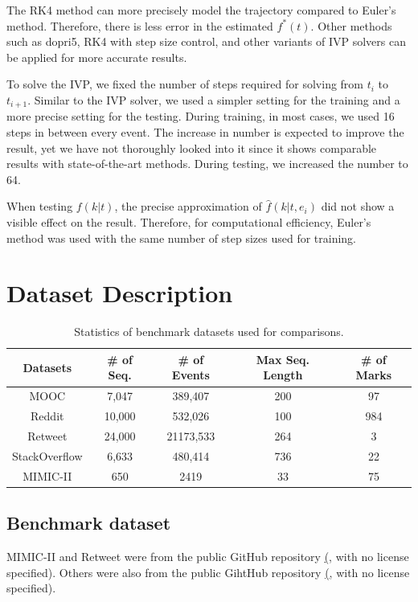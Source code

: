 The RK4 method can more precisely model the trajectory compared to Euler's method. 
Therefore, there is less error in the estimated $f^*(t)$.
Other methods such as dopri5, RK4 with step size control, and other variants of IVP solvers can be applied for more accurate results.

To solve the IVP, we fixed the number of steps required for solving from $t_i$ to $t_{i+1}$. Similar to the IVP solver, we used a simpler setting for the training and a more precise setting for the testing. During training, in most cases, we used 16 steps in between every event. The increase in number is expected to improve the result, yet we have not thoroughly looked into it since it shows comparable results with state-of-the-art methods. During testing, we increased the number to 64.

When testing $f(k|t)$, the precise approximation of $\hat{f} (k|t, e_i)$ did not show a visible effect on the result.
Therefore, for computational efficiency, Euler's method was used with the same number of step sizes used for training.



\section{Dataset Description}
\begin{table}[h]
    \centering
    \renewcommand{\arraystretch}{1.3}
        \begin{tabular}{c|c c c c}
            Datasets & \# of Seq. & \# of Events & Max Seq. Length & \# of Marks \\
            \hline
             MOOC & 7,047 & 389,407 & 200 & 97 \\ 
             Reddit & 10,000 & 532,026 & 100 & 984 \\ 
             Retweet & 24,000 & 21173,533 & 264 & 3 \\ 
             StackOverflow & 6,633 & 480,414 & 736 & 22 \\ 
             MIMIC-II & 650 & 2419 & 33 & 75 \\ 
        \end{tabular}
        \caption{Statistics of benchmark datasets used for comparisons.}
        \label{tab:data_stat}
    \end{table}

\subsection{Benchmark dataset}
MIMIC-II and Retweet were from the public GitHub repository \href{https://github.com/SimiaoZuo/Transformer-Hawkes-Process} (\cite{bib:THP}, with no license specified). Others were also from the public GihtHub repository \href{https://github.com/BIRD-TAO/GNTPP} (\cite{bib:exploring_generative}, with no license specified). 

